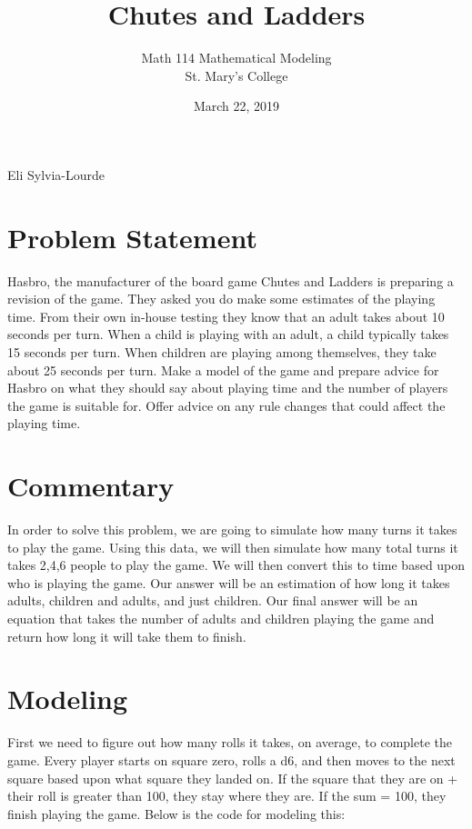 \documentclass[12pt]{article} %
\title{Chutes and Ladders}
\author{Math 114 Mathematical Modeling\\St. Mary's College}
\date{March 22, 2019}
\newcommand{\authors}{Eli Sylvia-Lourde}
\begin{document}
\hfill\authors %
{\let\newpage\relax\maketitle} %

\section*{Problem Statement}
Hasbro,	the	manufacturer	of	the	board	game	Chutes	and	Ladders is	preparing	a	revision	of	the
game.	They	asked	you	do	make	some	estimates	of	the	playing	time.	From	their	own	in-house
testing	they	know	that	an	adult	takes	about	10	seconds	per	turn.	When	a	child	is	playing	with
an	adult,	a	child	typically	takes	15	seconds	per	turn.	When	children	are	playing	among
themselves,	they	take	about	25	seconds	per	turn.
Make	a	model	of	the	game	and	prepare	advice	for	Hasbro	on	what	they	should	say	about
playing	time	and	the	number	of	players	the	game	is	suitable	for.	Offer	advice	on	any	rule
changes	that	could	affect	the	playing	time.

\section*{Commentary}
In order to solve this problem, we are going to simulate how many turns it takes to play the game. Using this data, we will then simulate how many total turns it takes 2,4,6 people to play the game. We will then convert this to time based upon who is playing the game. Our answer will be an estimation of how long it takes adults, children and adults, and just children. Our final answer will be an equation that takes the number of adults and children playing the game and return how long it will take them to finish.

\section*{Modeling}
First we need to figure out how many rolls it takes, on average, to complete the game. Every player starts on square zero, rolls a d6, and then moves to the next square based upon what square they landed on. If the square that they are on + their roll is greater than 100, they stay where they are. If the sum = 100, they finish playing the game. Below is the code for modeling this:
\end{document}
